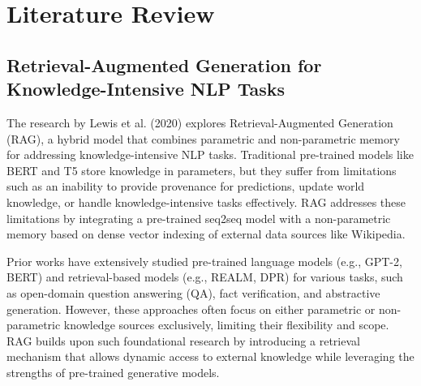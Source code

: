 \chapter{Literature Review}
\label{C2} %


\space
\clearpage



\section*{Retrieval-Augmented Generation for Knowledge-Intensive NLP Tasks\cite{rag}}

The research by Lewis et al. (2020) explores Retrieval-Augmented Generation (RAG), a hybrid model that combines parametric and non-parametric memory for addressing knowledge-intensive NLP tasks. Traditional pre-trained models like BERT\cite{devlin2019bertpretrainingdeepbidirectional} and T5 store knowledge in parameters, but they suffer from limitations such as an inability to provide provenance for predictions, update world knowledge, or handle knowledge-intensive tasks effectively. RAG addresses these limitations by integrating a pre-trained seq2seq model with a non-parametric memory based on dense vector indexing of external data sources like Wikipedia.

Prior works have extensively studied pre-trained language models (e.g., GPT-2, BERT) and retrieval-based models (e.g., REALM\cite{guu2020realmretrievalaugmentedlanguagemodel}, DPR\cite{dpr}) for various tasks, such as open-domain question answering (QA), fact verification, and abstractive generation. However, these approaches often focus on either parametric or non-parametric knowledge sources exclusively, limiting their flexibility and scope. RAG builds upon such foundational research by introducing a retrieval mechanism that allows dynamic access to external knowledge while leveraging the strengths of pre-trained generative models.

